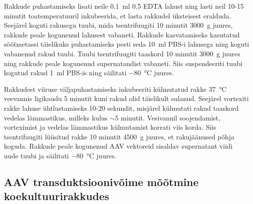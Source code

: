 \documentclass{trkut}%
\begin{document}
Rakkude puhastamiseks lisati neile \SI{0,1}{\milli\litre} \SI{0,5}{\molar} EDTA lahust ning lasti neil 10-15 minutit toatemperatuuril inkubeerida, et lasta rakkudel üksteisest eralduda. Seejärel koguti rakusegu tuubi, mida tsentrifuugiti 10 minutit \SI{3000}{\g} juures, rakkude peale kogunenud lahusest vabaneti. Rakkude kasvatamiseks kasutatud söötmetassi täielikuks puhastamiseks pesti seda \SI{10}{\milli\litre} PBS-i lahusega ning koguti vabanenud rakud tuubi. Tuubi tsentrifuugiti taaskord 10 minutit \SI{3000}{\g} juures ning rakkude peale kogunenud supernatandist vabaneti. Siis suspendeeriti tuubi kogutud rakud \SI{1}{\milli\litre} PBS-is ning säilitati \SI{-80}{\celsius} juures. 

Rakkudest viiruse väljapuhastamiseks inkubeeriti külmutatud rakke \SI{37}{\celsius} veevannis ligikaudu 5 minutit kuni rakud olid täielikult sulanud. Seejärel vortexiti rakke lahuse ühtlustamiseks 10-20 sekundit, misjärel külmutati rakud taaskord vedelas lämmastikus, milleks kulus $\sim$5 minutit. Vesivannil soojendamist, vorteximist ja vedelas lämmastikus külmutamist korrati viis korda. Siis tsentrifuugiti lüüsitud rakke 10 minutit \SI{4500}{\g} juures, et rakujäänused põhja koguda. Rakkude peale kogunenud AAV vektoreid sisaldav supernatant viidi uude tuubi ja säilitati \SI{-80}{\celsius} juures.



\subsection{AAV transduktsioonivõime mõõtmine koekultuurirakkudes}
\end{document}
